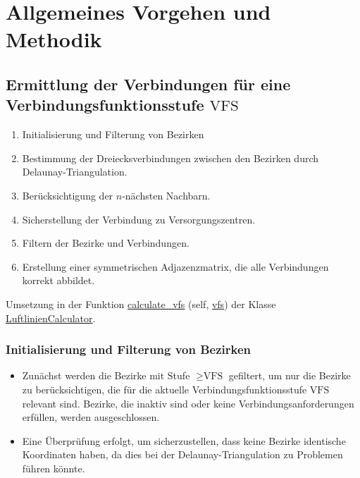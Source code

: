 \chapter{Allgemeines Vorgehen und Methodik}
\section{Ermittlung der Verbindungen für eine Verbindungsfunktionsstufe $\textrm{VFS}$}
\begin{enumerate}
	\item Initialisierung und Filterung von Bezirken
  \item Bestimmung der Dreiecksverbindungen zwischen den Bezirken durch Delaunay-Triangulation.
  \item Berücksichtigung der $n$-nächsten Nachbarn.
   \item Sicherstellung der Verbindung zu Versorgungszentren.
   \item Filtern der Bezirke und Verbindungen.
   \item Erstellung einer symmetrischen Adjazenzmatrix, die alle Verbindungen korrekt abbildet.
\end{enumerate}

Umsetzung in der Funktion  \mbox{\hyperlink{classluftlinientool_1_1_luftlinien_calculator_a10621c3a62ba5166684e6b769975492e}{calculate\+\_\+vfs}} (self, \mbox{\hyperlink{classluftlinientool_1_1_luftlinien_calculator_a1129397c7e2c387d806eec234eb62c7b}{vfs}}) der Klasse \mbox{\hyperlink{classluftlinientool_1_1_luftlinien_calculator}{Luftlinien\+Calculator}}.

\subsection*{Initialisierung und Filterung von Bezirken}
\begin{itemize}
\item
Zunächst werden die Bezirke mit Stufe $\geq \text{VFS}$ gefiltert, um nur die Bezirke zu berücksichtigen, die für die aktuelle Verbindungsfunktionsstufe $\textrm{VFS}$ relevant sind. Bezirke, die inaktiv sind oder keine Verbindungsanforderungen erfüllen, werden ausgeschlossen.
\item
 Eine Überprüfung erfolgt, um sicherzustellen, dass keine Bezirke identische Koordinaten haben, da dies bei der Delaunay-Triangulation zu Problemen führen könnte.
\end{itemize}

